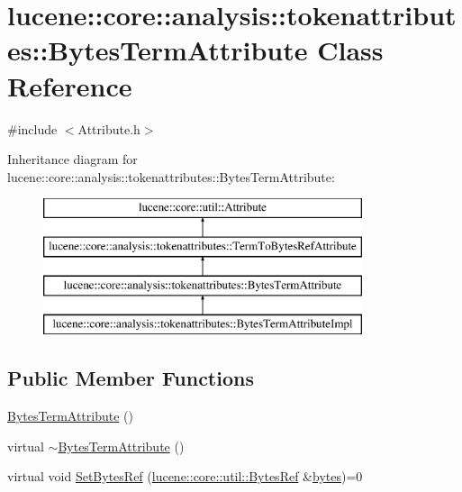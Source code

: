 \hypertarget{classlucene_1_1core_1_1analysis_1_1tokenattributes_1_1BytesTermAttribute}{}\section{lucene\+:\+:core\+:\+:analysis\+:\+:tokenattributes\+:\+:Bytes\+Term\+Attribute Class Reference}
\label{classlucene_1_1core_1_1analysis_1_1tokenattributes_1_1BytesTermAttribute}


{\ttfamily \#include $<$Attribute.\+h$>$}

Inheritance diagram for lucene\+:\+:core\+:\+:analysis\+:\+:tokenattributes\+:\+:Bytes\+Term\+Attribute\+:\begin{figure}[H]
\begin{center}
\leavevmode
\includegraphics[height=4.000000cm]{classlucene_1_1core_1_1analysis_1_1tokenattributes_1_1BytesTermAttribute}
\end{center}
\end{figure}
\subsection*{Public Member Functions}
\begin{DoxyCompactItemize}
\item 
\mbox{\hyperlink{classlucene_1_1core_1_1analysis_1_1tokenattributes_1_1BytesTermAttribute_a96572fed858fc7b45f0fe36269e41afc}{Bytes\+Term\+Attribute}} ()
\item 
virtual \mbox{\hyperlink{classlucene_1_1core_1_1analysis_1_1tokenattributes_1_1BytesTermAttribute_aa8b2f75f5cb46ff154fba02323d0ae16}{$\sim$\+Bytes\+Term\+Attribute}} ()
\item 
virtual void \mbox{\hyperlink{classlucene_1_1core_1_1analysis_1_1tokenattributes_1_1BytesTermAttribute_ac0aafed04df791feabdc9771280110b9}{Set\+Bytes\+Ref}} (\mbox{\hyperlink{classlucene_1_1core_1_1util_1_1BytesRef}{lucene\+::core\+::util\+::\+Bytes\+Ref}} \&\mbox{\hyperlink{classlucene_1_1core_1_1analysis_1_1tokenattributes_1_1BytesTermAttribute_adf534bc1c061247d7802bdb765236b89}{bytes}})=0
\end{DoxyCompactItemize}
